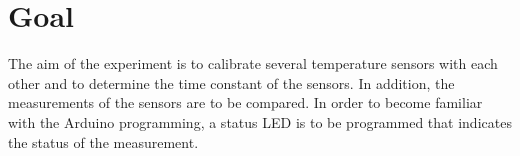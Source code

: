 \section*{Goal}
The aim of the experiment is to calibrate several temperature sensors with each other and to determine the time constant of the sensors.
In addition, the measurements of the sensors are to be compared.
In order to become familiar with the Arduino programming, a status LED is to be programmed that indicates the status of the measurement.






